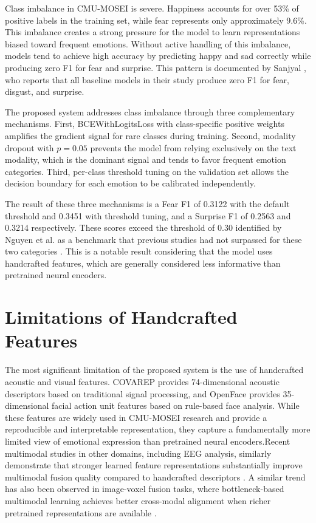 Class imbalance in CMU-MOSEI is severe. Happiness accounts for over 53\% of positive labels in the training set, while fear represents only approximately 9.6\%. This imbalance creates a strong pressure for the model to learn representations biased toward frequent emotions. Without active handling of this imbalance, models tend to achieve high accuracy by predicting happy and sad correctly while producing zero F1 for fear and surprise. This pattern is documented by Sanjyal \cite{sanjyal2026affectdiff}, who reports that all baseline models in their study produce zero F1 for fear, disgust, and surprise.

The proposed system addresses class imbalance through three complementary mechanisms. First, BCEWithLogitsLoss with class-specific positive weights amplifies the gradient signal for rare classes during training. Second, modality dropout with $p = 0.05$ prevents the model from relying exclusively on the text modality, which is the dominant signal and tends to favor frequent emotion categories. Third, per-class threshold tuning on the validation set allows the decision boundary for each emotion to be calibrated independently.

The result of these three mechanisms is a Fear F1 of 0.3122 with the default threshold and 0.3451 with threshold tuning, and a Surprise F1 of 0.2563 and 0.3214 respectively. These scores exceed the threshold of 0.30 identified by Nguyen et al. as a benchmark that previous studies had not surpassed for these two categories \cite{nguyen2025enhanced}. This is a notable result considering that the model uses handcrafted features, which are generally considered less informative than pretrained neural encoders.

\section{Limitations of Handcrafted Features}

The most significant limitation of the proposed system is the use of handcrafted acoustic and visual features. COVAREP provides 74-dimensional acoustic descriptors based on traditional signal processing, and OpenFace provides 35-dimensional facial action unit features based on rule-based face analysis. While these features are widely used in CMU-MOSEI research and provide a reproducible and interpretable representation, they capture a fundamentally more limited view of emotional expression than pretrained neural encoders.Recent multimodal studies in other domains, including EEG analysis, similarly demonstrate that stronger learned feature representations substantially improve multimodal fusion quality compared to handcrafted descriptors \cite{kim2022accelerating}. A similar trend has also been observed in image-voxel fusion tasks, where bottleneck-based multimodal learning achieves better cross-modal alignment when richer pretrained representations are available \cite{yuan2023learning}.

